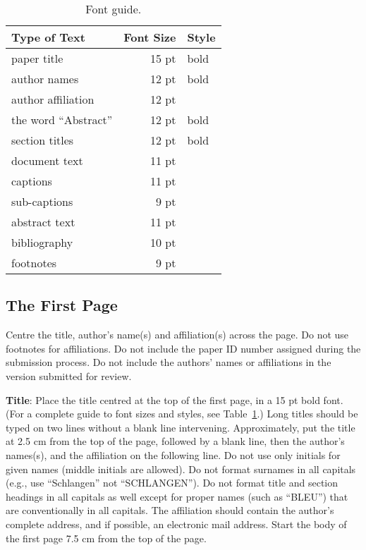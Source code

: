 \documentclass[11pt]{article}
\begin{document}
\begin{table}[h]
\begin{center}
\begin{tabular}{|l|rl|}
\hline \bf Type of Text & \bf Font Size & \bf Style \\ \hline
paper title & 15 pt & bold \\
author names & 12 pt & bold \\
author affiliation & 12 pt & \\
the word ``Abstract'' & 12 pt & bold \\
section titles & 12 pt & bold \\
document text & 11 pt  &\\
captions & 11 pt & \\
sub-captions & 9 pt & \\
abstract text & 11 pt & \\
bibliography & 10 pt & \\
footnotes & 9 pt & \\
\hline
\end{tabular}
\end{center}
\caption{\label{font-table} Font guide. }
\end{table}

\subsection{The First Page}
\label{ssec:first}

Centre the title, author's name(s) and affiliation(s) across
the page.
Do not use footnotes for affiliations. Do not include the
paper ID number assigned during the submission process. 
Do not include the authors' names or affiliations in the version submitted for review.

{\bf Title}: Place the title centred at the top of the first page, in
a 15 pt bold font. (For a complete guide to font sizes and styles,
see Table~\ref{font-table}.) Long titles should be typed on two lines
without a blank line intervening. Approximately, put the title at 2.5
cm from the top of the page, followed by a blank line, then the
author's names(s), and the affiliation on the following line. Do not
use only initials for given names (middle initials are allowed). Do
not format surnames in all capitals (e.g., use ``Schlangen'' not
``SCHLANGEN'').  Do not format title and section headings in all
capitals as well except for proper names (such as ``BLEU'') that are
conventionally in all capitals.  The affiliation should contain the
author's complete address, and if possible, an electronic mail
address. Start the body of the first page 7.5 cm from the top of the
page.
\end{document}
